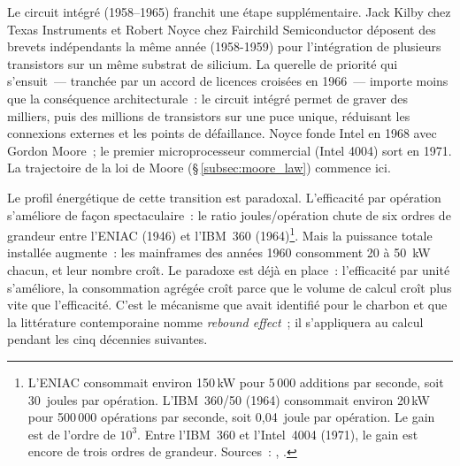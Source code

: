 %
Le circuit intégré (1958--1965) franchit une étape supplémentaire. Jack Kilby chez Texas Instruments et Robert Noyce chez Fairchild Semiconductor déposent des brevets indépendants la même année (1958-1959) pour l'intégration de plusieurs transistors sur un même substrat de silicium. La querelle de priorité qui s'ensuit~--- tranchée par un accord de licences croisées en 1966~--- importe moins que la conséquence architecturale~: le circuit intégré permet de graver des milliers, puis des millions de transistors sur une puce unique, réduisant les connexions externes et les points de défaillance. Noyce fonde Intel en 1968 avec Gordon Moore~; le premier microprocesseur commercial (Intel 4004) sort en 1971. La trajectoire de la loi de Moore (§\,\ref{subsec:moore_law}) commence ici.

%
Le profil énergétique de cette transition est paradoxal. L'efficacité par opération s'améliore de façon spectaculaire~: le ratio joules/opération chute de six ordres de grandeur entre l'ENIAC (1946) et l'IBM~360 (1964)\footnote{L'ENIAC consommait environ 150\,kW pour 5\,000 additions par seconde, soit 30~joules par opération. L'IBM~360/50 (1964) consommait environ 20\,kW pour 500\,000 opérations par seconde, soit 0,04~joule par opération. Le gain est de l'ordre de $10^{3}$. Entre l'IBM~360 et l'Intel~4004 (1971), le gain est encore de trois ordres de grandeur. Sources~: \textcite{nordhaus_two_2007}, \textcite{koomey_implications_2011}.}. Mais la puissance totale installée augmente~: les mainframes des années 1960 consomment 20 à 50~kW chacun, et leur nombre croît. Le paradoxe est déjà en place~: l'efficacité par unité s'améliore, la consommation agrégée croît parce que le volume de calcul croît plus vite que l'efficacité. C'est le mécanisme que \textcite{jevons_coal_1865} avait identifié pour le charbon et que la littérature contemporaine nomme \emph{rebound effect}~; il s'appliquera au calcul pendant les cinq décennies suivantes.



